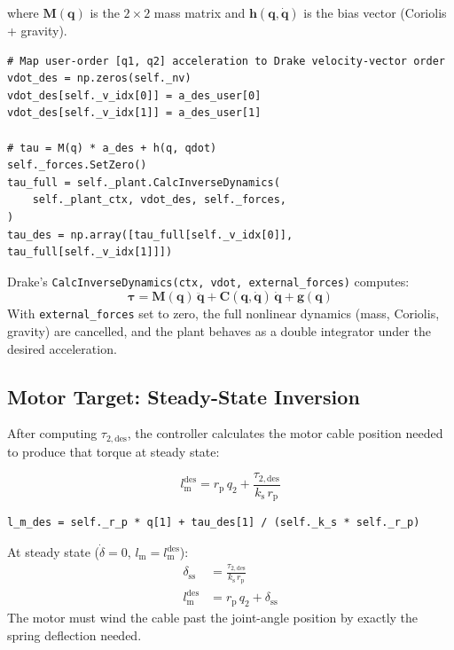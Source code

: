 \documentclass[11pt,a4paper]{article}
\newcommand{\rp}{r_{\mathrm{p}}}
\newcommand{\bq}{\bm{q}}
\newcommand{\btau}{\bm{\tau}}
\newcommand{\bM}{\bm{M}}
\newcommand{\bh}{\bm{h}}
\newcommand{\lm}{l_{\mathrm{m}}}
\newcommand{\ks}{k_{\mathrm{s}}}
\begin{document}
where $\bM(\bq)$ is the $2 \times 2$ mass matrix and $\bh(\bq, \dot{\bq})$ is the bias vector (Coriolis + gravity).

\begin{lstlisting}[caption={Computed torque: inverse dynamics via Drake.}]
# Map user-order [q1, q2] acceleration to Drake velocity-vector order
vdot_des = np.zeros(self._nv)
vdot_des[self._v_idx[0]] = a_des_user[0]
vdot_des[self._v_idx[1]] = a_des_user[1]

# tau = M(q) * a_des + h(q, qdot)
self._forces.SetZero()
tau_full = self._plant.CalcInverseDynamics(
    self._plant_ctx, vdot_des, self._forces,
)
tau_des = np.array([tau_full[self._v_idx[0]], tau_full[self._v_idx[1]]])
\end{lstlisting}

\begin{codemath}
Drake's \texttt{CalcInverseDynamics(ctx, vdot, external\_forces)} computes:
\[
    \btau = \bM(\bq) \, \ddot{\bq} + \bm{C}(\bq, \dot{\bq})\,\dot{\bq} + \bm{g}(\bq)
\]
With \texttt{external\_forces} set to zero, the full nonlinear dynamics (mass, Coriolis, gravity) are cancelled, and the plant behaves as a double integrator under the desired acceleration.
\end{codemath}


\subsection{Motor Target: Steady-State Inversion}

After computing $\tau_{2,\mathrm{des}}$, the controller calculates the motor cable position needed to produce that torque at steady state:

\begin{equation}
\boxed{
    \lm^{\mathrm{des}} = \rp \, q_2 + \frac{\tau_{2,\mathrm{des}}}{\ks \, \rp}
}
\label{eq:motor_target_ct}
\end{equation}

\begin{lstlisting}[caption={Motor target from desired torque (steady-state spring inversion).}]
l_m_des = self._r_p * q[1] + tau_des[1] / (self._k_s * self._r_p)
\end{lstlisting}

\begin{codemath}
At steady state ($\dot{\delta} = 0$, $\lm = \lm^{\mathrm{des}}$):
\begin{align*}
    \delta_{\mathrm{ss}} &= \frac{\tau_{2,\mathrm{des}}}{\ks \, \rp} \\
    \lm^{\mathrm{des}} &= \rp \, q_2 + \delta_{\mathrm{ss}}
\end{align*}
The motor must wind the cable past the joint-angle position by exactly the spring deflection needed.
\end{codemath}
\end{document}
